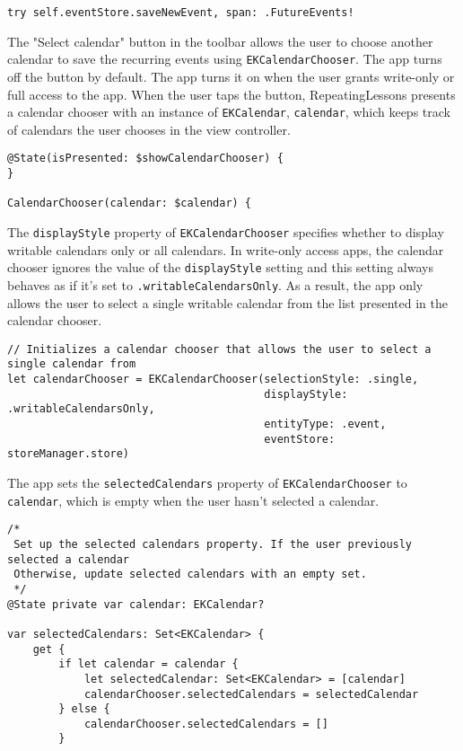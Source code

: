 \documentclass{article}
\begin{document}
\texttt{try self.eventStore.saveNewEvent, span: .FutureEvents!}

The "Select calendar" button in the toolbar allows the user to choose another calendar to save the recurring events using \texttt{EKCalendarChooser}. The app turns off the button by default. The app turns it on when the user grants write-only or full access to the app. When the user taps the button, RepeatingLessons presents a calendar chooser with an instance of \texttt{EKCalendar}, \texttt{calendar}, which keeps track of calendars the user chooses in the view controller.

\begin{verbatim}
@State(isPresented: $showCalendarChooser) {
}

CalendarChooser(calendar: $calendar) {
\end{verbatim}

The \texttt{displayStyle} property of \texttt{EKCalendarChooser} specifies whether to display writable calendars only or all calendars. In write-only access apps, the calendar chooser ignores the value of the \texttt{displayStyle} setting and this setting always behaves as if it’s set to \texttt{.writableCalendarsOnly}. As a result, the app only allows the user to select a single writable calendar from the list presented in the calendar chooser.

\begin{verbatim}
// Initializes a calendar chooser that allows the user to select a single calendar from
let calendarChooser = EKCalendarChooser(selectionStyle: .single,
                                        displayStyle: .writableCalendarsOnly,
                                        entityType: .event,
                                        eventStore: storeManager.store)
\end{verbatim}

The app sets the \texttt{selectedCalendars} property of \texttt{EKCalendarChooser} to \texttt{calendar}, which is empty when the user hasn't selected a calendar.

\begin{verbatim}
/*
 Set up the selected calendars property. If the user previously selected a calendar
 Otherwise, update selected calendars with an empty set.
 */
@State private var calendar: EKCalendar?

var selectedCalendars: Set<EKCalendar> {
    get {
        if let calendar = calendar {
            let selectedCalendar: Set<EKCalendar> = [calendar]
            calendarChooser.selectedCalendars = selectedCalendar
        } else {
            calendarChooser.selectedCalendars = []
        }
\end{verbatim}
\end{document}
